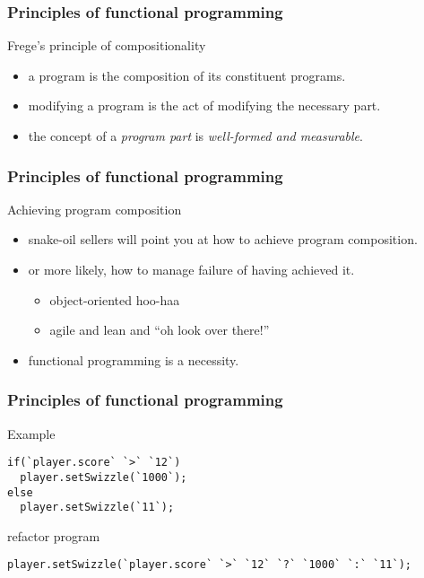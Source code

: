 \begin{frame}
\frametitle{Principles of functional programming}
\begin{block}{Frege's principle of compositionality}
\begin{itemize}
\item<1-> a program is the composition of its constituent programs.
\item<2-> modifying a program is the act of modifying the necessary part.
\item<3-> the concept of a \emph{program part} is \emph{well-formed and measurable}.
\end{itemize}
\end{block}
\end{frame}

\begin{frame}
\frametitle{Principles of functional programming}
\begin{block}{Achieving program composition}
\begin{itemize}
\item<1-> snake-oil sellers will point you at how to achieve program composition.
\item<2-> or more likely, how to manage failure of having achieved it.
          \begin{itemize}
          \item \tiny{object-oriented hoo-haa}
          \item \tiny{agile and lean and ``oh look over there!''}
          \end{itemize}
\item<3-> functional programming is a necessity.
\end{itemize}
\end{block}
\end{frame}

\begin{frame}[fragile]
\frametitle{Principles of functional programming}
\begin{block}{Example}
\begin{lstlisting}[style=java,mathescape,basicstyle=\scriptsize]
if(`player.score` `>` `12`)
  player.setSwizzle(`1000`);
else
  player.setSwizzle(`11`);
\end{lstlisting}
\end{block}
\begin{block}{refactor program}
\begin{lstlisting}[style=java,mathescape,basicstyle=\scriptsize]
player.setSwizzle(`player.score` `>` `12` `?` `1000` `:` `11`);
\end{lstlisting}
\end{block}
\end{frame}

